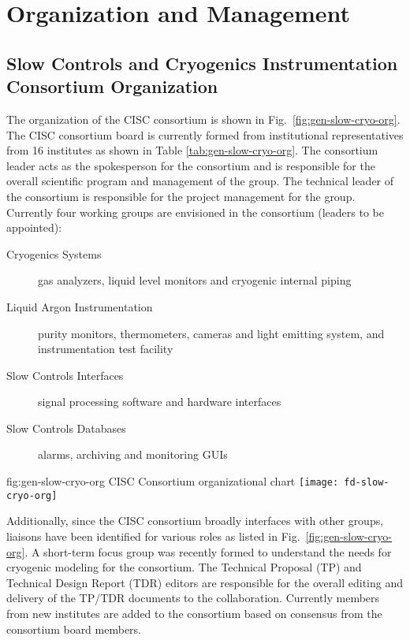 \section{Organization and Management}
\label{sec:fdgen-slow-cryo-org}

\subsection{Slow Controls and Cryogenics Instrumentation Consortium Organization}
\label{sec:fdgen-slow-cryo-org-consortium}


The organization of the CISC consortium is shown in
Fig.\ \ref{fig:gen-slow-cryo-org}. The CISC consortium board is
currently formed from institutional representatives from 16 institutes
as shown in Table \ref{tab:gen-slow-cryo-org}. The consortium leader
acts as the spokesperson for the consortium and is responsible for the
overall scientific program and management of the group. The technical
leader of the consortium is responsible for the project management for
the group.  Currently four working groups are envisioned in the
consortium (leaders to be appointed):

\begin{description}
 \item[Cryogenics Systems] gas analyzers, liquid level
  monitors and cryogenic internal piping
 \item[Liquid Argon Instrumentation] purity monitors, thermometers,
  cameras and light emitting system, and instrumentation test facility
 \item[Slow Controls Interfaces] signal processing software and
  hardware interfaces
 \item[Slow Controls Databases] alarms, archiving and monitoring GUIs
\end{description}

\begin{dunefigure}{fig:gen-slow-cryo-org}
{CISC Consortium organizational chart}
\texttt{[image: fd-slow-cryo-org]}
\end{dunefigure}

Additionally, since the CISC consortium broadly interfaces with other
groups, liaisons have been identified for various roles as listed in
Fig.\ \ref{fig:gen-slow-cryo-org}. A short-term focus group was
recently formed to understand the needs for cryogenic modeling for the
consortium. The Technical Proposal (TP) and Technical Design Report
(TDR) editors are responsible for the overall editing and delivery of
the TP/TDR documents to the collaboration. Currently members from new
institutes are added to the consortium based on consensus from the
consortium board members.

